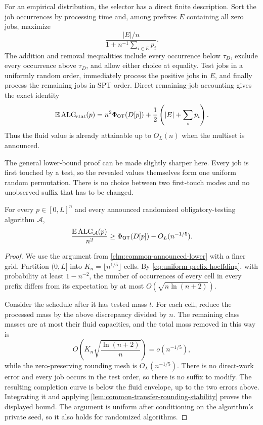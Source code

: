 For an empirical distribution, the selector has a direct finite
description.  Sort the job occurrences by processing time and, among
prefixes $E$ containing all zero jobs, maximize
\begin{equation}
 \frac{|E|/n}{1+n^{-1}\sum_{i\in E}p_i}.
 \label{eq:ot-finite-density}
\end{equation}
The addition and removal inequalities include every occurrence below
$\tau_D$, exclude every occurrence above $\tau_D$, and allow either choice
at equality.  Test jobs in a uniformly random order, immediately process
the positive jobs in $E$, and finally process the remaining jobs in SPT
order.  Direct remaining-job accounting gives the exact identity
\begin{equation}
 \mathbb{E}\operatorname{ALG}_{\mathrm{stat}}(p)
 =n^2\Phi_{\mathsf{OT}}(D[p])
  +\frac12\left(|E|+\sum_i p_i\right).
 \label{eq:ot-announced-upper}
\end{equation}
Thus the fluid value is already attainable up to $O_L(n)$ when the multiset
is announced.

The general lower-bound proof can be made slightly sharper here.  Every job
is first touched by a test, so the revealed values themselves form one
uniform random permutation.  There is no choice between two first-touch
modes and no unobserved suffix that has to be changed.

\begin{claim}
\label{clm:ot-announced-lower}
For every $p\in[0,L]^n$ and every announced randomized obligatory-testing
algorithm $\mathcal A$,
\begin{equation}
 \frac{\mathbb{E}\operatorname{ALG}_{\mathcal A}(p)}{n^2}
 \ge\Phi_{\mathsf{OT}}(D[p])-O_L(n^{-1/5}).
 \label{eq:ot-announced-lower}
\end{equation}
\end{claim}

\begin{proof}
We use the argument from \cref{clm:common-announced-lower} with a finer
grid.  Partition $(0,L]$ into $K_n=\lfloor n^{1/5}\rfloor$ cells.  By
\cref{eq:uniform-prefix-hoeffding}, with probability at least $1-n^{-2}$,
the number of occurrences of every cell in every prefix differs from its
expectation by at most $O(\sqrt{n\ln(n+2)})$.

Consider the schedule after it has tested mass $t$.  For each cell, reduce
the processed mass by the above discrepancy divided by $n$.  The remaining
class masses are at most their fluid capacities, and the total mass removed
in this way is
\[
 O\!\left(K_n\sqrt{\frac{\ln(n+2)}n}\right)
 =o(n^{-1/5}),
\]
while the zero-preserving rounding mesh is $O_L(n^{-1/5})$.  There is no
direct-work error and every job occurs in the test order, so there is no
suffix to modify.  The resulting completion curve is below the fluid
envelope, up to the two errors above.  Integrating it and applying
\cref{lem:common-transfer-rounding-stability} proves the displayed bound.
The argument is uniform after conditioning on the algorithm's private seed,
so it also holds for randomized algorithms.
\end{proof}

